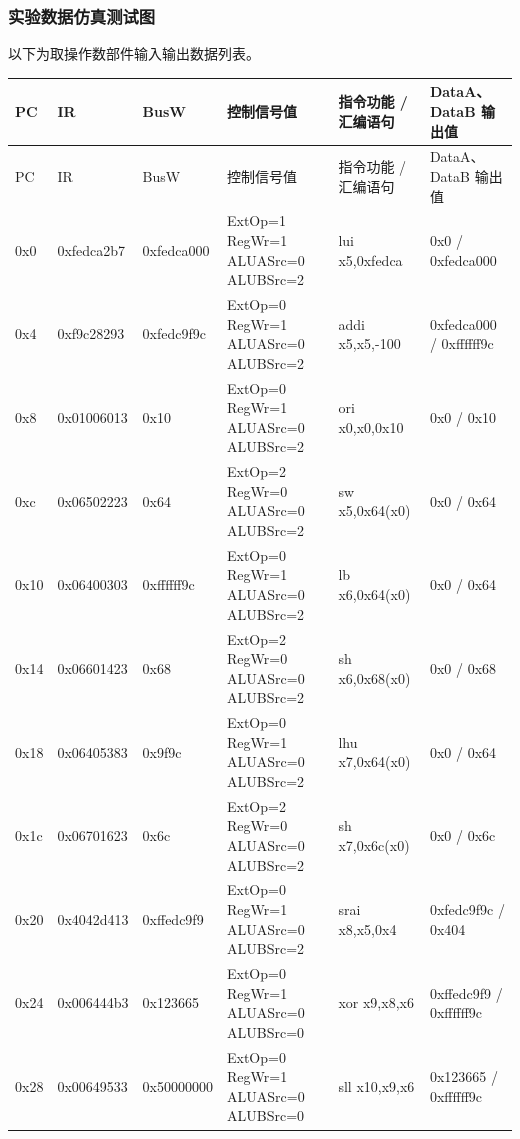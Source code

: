 \documentclass[UTF8,a4paper,11pt]{ctexart}
\newcommand{\placeholder}[1]{
\begin{tcolorbox}[colback=sub,colframe=main,boxrule=0.6pt,arc=2mm,left=2mm,right=2mm,top=1mm,bottom=1mm]
#1
\end{tcolorbox}
}
\begin{document}
\subsubsection{实验数据仿真测试图}
\placeholder{
    以下为取操作数部件输入输出数据列表。
}

\begingroup
\small
\renewcommand{\arraystretch}{1.15}
\setlength{\tabcolsep}{1pt}
\setlength{\LTleft}{0pt}
\setlength{\LTright}{0pt}
\begin{longtable}{|>{\centering\arraybackslash}p{0.8cm}|>{\centering\arraybackslash}p{1.85cm}|>{\centering\arraybackslash}p{2.05cm}|>{\centering\arraybackslash}p{3.1cm}|>{\centering\arraybackslash}p{3.95cm}|>{\centering\arraybackslash}p{3.05cm}|}
\hline
PC & IR & BusW & 控制信号值 & 指令功能 / 汇编语句 & DataA、DataB 输出值 \\
\hline
\endfirsthead
\hline
PC & IR & BusW & 控制信号值 & 指令功能 / 汇编语句 & DataA、DataB 输出值 \\
\hline
\endhead
\hline
\endfoot
\hline
\endlastfoot
0x0 & 0xfedca2b7 & 0xfedca000 & ExtOp=1 RegWr=1 ALUASrc=0 ALUBSrc=2 & lui x5,0xfedca & 0x0 / 0xfedca000 \\
\hline
0x4 & 0xf9c28293 & 0xfedc9f9c & ExtOp=0 RegWr=1 ALUASrc=0 ALUBSrc=2 & addi x5,x5,-100 & 0xfedca000 / 0xffffff9c \\
\hline
0x8 & 0x01006013 & 0x10 & ExtOp=0 RegWr=1 ALUASrc=0 ALUBSrc=2 & ori x0,x0,0x10 & 0x0 / 0x10 \\
\hline
0xc & 0x06502223 & 0x64 & ExtOp=2 RegWr=0 ALUASrc=0 ALUBSrc=2 & sw x5,0x64(x0) & 0x0 / 0x64 \\
\hline
0x10 & 0x06400303 & 0xffffff9c & ExtOp=0 RegWr=1 ALUASrc=0 ALUBSrc=2 & lb x6,0x64(x0) & 0x0 / 0x64 \\
\hline
0x14 & 0x06601423 & 0x68 & ExtOp=2 RegWr=0 ALUASrc=0 ALUBSrc=2 & sh x6,0x68(x0) & 0x0 / 0x68 \\
\hline
0x18 & 0x06405383 & 0x9f9c & ExtOp=0 RegWr=1 ALUASrc=0 ALUBSrc=2 & lhu x7,0x64(x0) & 0x0 / 0x64 \\
\hline
0x1c & 0x06701623 & 0x6c & ExtOp=2 RegWr=0 ALUASrc=0 ALUBSrc=2 & sh x7,0x6c(x0) & 0x0 / 0x6c \\
\hline
0x20 & 0x4042d413 & 0xffedc9f9 & ExtOp=0 RegWr=1 ALUASrc=0 ALUBSrc=2 & srai x8,x5,0x4 & 0xfedc9f9c / 0x404 \\
\hline
0x24 & 0x006444b3 & 0x123665 & ExtOp=0 RegWr=1 ALUASrc=0 ALUBSrc=0 & xor x9,x8,x6 & 0xffedc9f9 / 0xffffff9c \\
\hline
0x28 & 0x00649533 & 0x50000000 & ExtOp=0 RegWr=1 ALUASrc=0 ALUBSrc=0 & sll x10,x9,x6 & 0x123665 / 0xffffff9c \\

\end{longtable}
\end{document}
